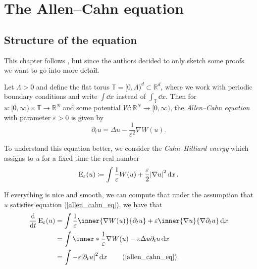 \chapter{The Allen--Cahn equation}

\section{Structure of the equation}

This chapter follows \cite{convergence_of_allen_cahn_equation_to_multiphase_mean_curvature_flow}, but since the authors decided to only sketch some proofs. we want to go into more detail.

Let $ \Lambda > 0 $ and define the flat torus 
$ \mathbb{T} = [0, \Lambda )^{ d } \subset \mathbb{ R }^{ d } $, 
where we work with periodic boundary conditions and write $ \int \dd{x} $ instead of $ \int_{ \mathbb{ T } } \dd{x} $.
Then for 
$ u \colon [ 0 , \infty ) \times \mathbb{ T } \to \mathbb{ R }^{ N } $ 
and some potential 
$ W \colon \mathbb{ R }^{ N } \to [0, \infty ) $,
the \emph{Allen--Cahn equation} with parameter $ \varepsilon > 0 $ is given by
\begin{equation}
	\label{allen_cahn_eq}
	\partial_{ t } u 
	=
	\Delta u - \frac{1 }{ \varepsilon^{ 2 } } \nabla W ( u ).
\end{equation}

To understand this equation better, we consider the \emph{Cahn--Hilliard energy} which assigns to $ u $ for a fixed time the real number
\begin{equation}
	\label{cahn_hilliard_energy}
	\operatorname{E}_{ \varepsilon } 
		(u)
	\coloneqq
	\int
		\frac{ 1 }{ \varepsilon }
		W ( u )
		+
		\frac{ \varepsilon }{ 2 }
		\abs{ \nabla u }^{ 2 }
	\dd{x}.
\end{equation}

If everything is nice and smooth, we can compute that under the assumption that $ u $ satisfies 
equation (\ref{allen_cahn_eq}), we have that
\begin{align*}
	\dv{t} \energy_{ \varepsilon } ( u )
	&=
	\int
		\frac{ 1 }{ \varepsilon }
		\inner{\nabla W ( u )}{ \partial_{ t } u}
		+
		\varepsilon
		\inner{\nabla u}{ \nabla \partial_{ t } u}
	\dd{x}
	\\
	&=
	\int
		\inner*{ \frac{ 1 }{\varepsilon } \nabla W ( u ) - \varepsilon \Delta u  }{ \partial_{ t } u }
	\dd{x}
	\\
	&=
	\int - \varepsilon \abs{ \partial_{ t } u }^{ 2 } \dd{ x }
	\tag{\ref{allen_cahn_eq}}.
\end{align*}

